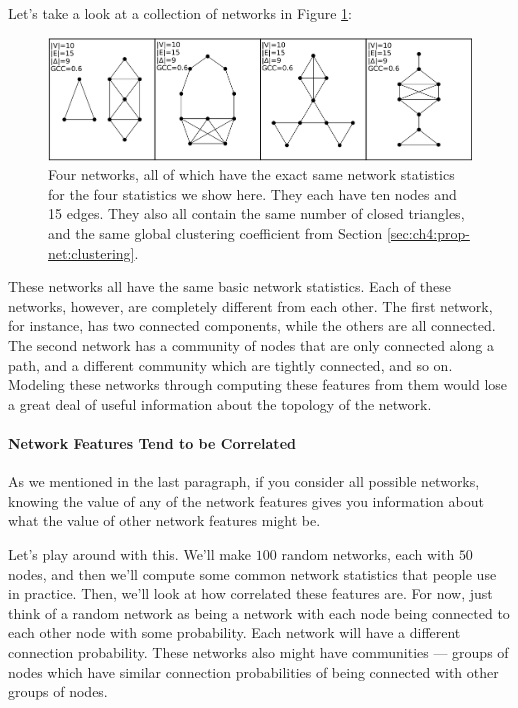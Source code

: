 Let's take a look at a collection of networks in Figure \ref{fig:ch4:anascombe}:

\begin{figure}[h]
    \centering
    \includegraphics[width=\linewidth]{representations/ch4/Images/anascombe.jpeg}
    \caption[Very different networks can have the same summary statistics]{Four networks, all of which have the exact same network statistics for the four statistics we show here. They each have ten nodes and 15 edges. They also all contain the same number of closed triangles, and the same global clustering coefficient from Section \ref{sec:ch4:prop-net:clustering}.}
    \label{fig:ch4:anascombe}
\end{figure}

These networks all have the same basic network statistics. Each of these networks, however, are completely different from each other. The first network, for instance, has two connected components, while the others are all connected. The second network has a community of nodes that are only connected along a path, and a different community which are tightly connected, and so on. Modeling these networks through computing these features from them would lose a great deal of useful information about the topology of the network.


\paragraph{Network Features Tend to be Correlated}
\label{sec:ch4:net-rep:featurelims}

As we mentioned in the last paragraph, if you consider all possible networks, knowing the value of any of the network features gives you information about what the value of other network features might be.

Let's play around with this. We'll make $100$ random networks, each with $50$ nodes, and then we'll compute some common network statistics that people use in practice. Then, we'll look at how correlated these features are. For now, just think of a random network as being a network with each node being connected to each other node with some probability. Each network will have a different connection probability. These networks also might have communities --- groups of nodes which have similar connection probabilities of being connected with other groups of nodes. 

